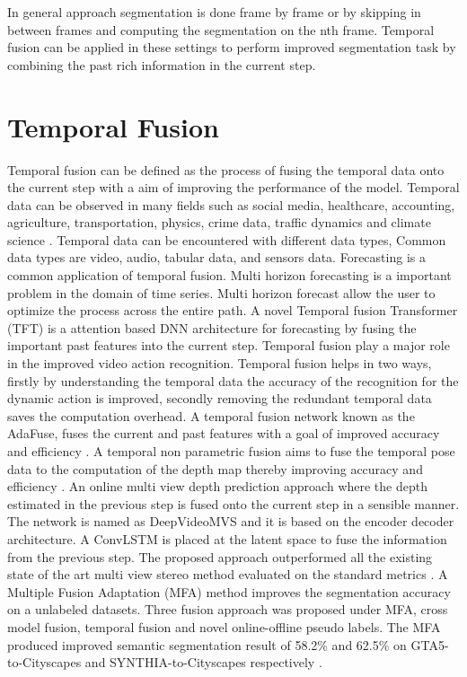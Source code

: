     In general approach segmentation is done frame by frame or by skipping in between frames and computing the segmentation on the nth frame. Temporal fusion can be applied in these settings to perform improved segmentation task by combining the past rich information in the current step. 
     
    \section{Temporal Fusion}
    \label{sec:tempfuse}
    
	Temporal fusion can be defined as the process of fusing the temporal data onto the current step with a aim of improving the performance of the model. Temporal data can be observed in many fields such as social media, healthcare, accounting, agriculture, transportation, physics, crime data, traffic dynamics and climate science \cite{49_atluri2018spatio}. Temporal data can be encountered with different data types, Common data types are video, audio, tabular data, and sensors data. Forecasting is a common application of temporal fusion. Multi horizon forecasting is a important problem in the domain of time series. Multi horizon forecast allow the user to optimize the process across the entire path. A novel Temporal fusion Transformer (TFT) \cite{50_lim2021temporal} is a attention based DNN architecture for forecasting by fusing the important past features into the current step. Temporal fusion play a major role in the improved video action recognition. Temporal fusion helps in two ways, firstly by understanding the temporal data the accuracy of the recognition for the dynamic action is improved, secondly removing the redundant temporal data saves the computation overhead. A temporal fusion network known as the AdaFuse, fuses the current and past features with a goal of improved accuracy and efficiency \cite{51_meng2021adafuse}. A temporal non parametric fusion aims to fuse the 
	temporal pose data to the computation of the depth map thereby improving accuracy and efficiency \cite{52_hou2019multi}.  An online multi view depth prediction approach where the depth estimated in the previous step is fused onto the current step in a sensible manner. The network is named as DeepVideoMVS and it is based on the encoder decoder architecture. A ConvLSTM is placed at the latent space to fuse the information from the previous step. The proposed approach outperformed all the existing state of the art multi view stereo method evaluated on the standard metrics \cite{53_duzceker2021deepvideomvs}. 
	A Multiple Fusion Adaptation (MFA) method improves the segmentation accuracy on a unlabeled datasets. Three fusion approach was proposed under MFA, cross model fusion, temporal fusion and novel online-offline pseudo labels. The MFA produced improved semantic segmentation result of 58.2\% and 62.5\% on GTA5-to-Cityscapes and SYNTHIA-to-Cityscapes respectively \cite{54_zhang2021multiple}.  
    
